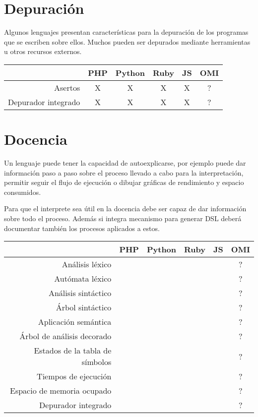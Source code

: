 \section{Depuración}
Algunos lenguajes presentan características para la depuración de los programas que se escriben 
sobre ellos. Muchos pueden ser depurados mediante herramientas u otros recursos 
externos. 

\FloatBarrier
\begin{table}[h]
\begin{center}
 
\begin{tabular}{|r|c|c|c|c|c|} \hline
 & PHP  & Python & Ruby & JS & OMI\\ \hline
Asertos   & X & X &  X & X  & ? \\ \hline
Depurador integrado  & X & X & X & X & ? \\ \hline
\end{tabular}
\end{center}
\end{table}
\FloatBarrier


\section{Docencia} 
Un lenguaje puede tener la capacidad de autoexplicarse, por ejemplo puede dar información 
paso a paso sobre el proceso llevado a cabo para la interpretación, permitir 
seguir el flujo de ejecución o dibujar gráficas de rendimiento y espacio consumidos.

Para que el interprete sea útil en la docencia debe ser capaz de dar información sobre todo 
el proceso. Además si integra mecanismo para generar DSL deberá documentar también los procesos
aplicados a estos. 

\FloatBarrier
\begin{table}[h]
\begin{center}
 
\begin{tabular}{|r|c|c|c|c|c|} \hline
 & PHP  & Python & Ruby & JS & OMI\\ \hline
Análisis léxico  &  &  &   &   & ? \\ \hline
Autómata léxico  &  &  &   &   & ? \\ \hline
Análisis sintáctico  &  &  &   &   & ? \\ \hline
Árbol sintáctico  &  &  &   &   & ? \\ \hline
Aplicación semántica  &  &  &   &   & ? \\ \hline
Árbol de análisis decorado &  &  &   &   & ? \\ \hline
Estados de la tabla de símbolos  &  &  &   &   & ? \\ \hline
Tiempos de ejecución  &  &  &   &   & ? \\ \hline
Espacio de memoria ocupado &  &  &   &   & ? \\ \hline
Depurador integrado  &  &  &   &   & ? \\ \hline
\end{tabular}
\end{center}
\end{table}
\FloatBarrier



